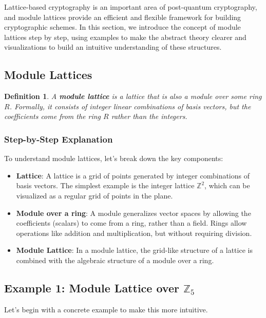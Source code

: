 \documentclass[12pt]{article}
\newtheorem{definition}{Definition}
\begin{document}
	Lattice-based cryptography is an important area of post-quantum cryptography, and module lattices provide an efficient and flexible framework for building cryptographic schemes. In this section, we introduce the concept of module lattices step by step, using examples to make the abstract theory clearer and visualizations to build an intuitive understanding of these structures.
	
	\subsection{Module Lattices}
	
	\begin{definition}
		A \textbf{module lattice} is a lattice that is also a module over some ring $R$. Formally, it consists of integer linear combinations of basis vectors, but the coefficients come from the ring $R$ rather than the integers.
	\end{definition}
	
	\subsubsection{Step-by-Step Explanation}
	To understand module lattices, let’s break down the key components:
	\begin{itemize}
		\item \textbf{Lattice}: A lattice is a grid of points generated by integer combinations of basis vectors. The simplest example is the integer lattice $\mathbb{Z}^2$, which can be visualized as a regular grid of points in the plane.
		\item \textbf{Module over a ring}: A module generalizes vector spaces by allowing the coefficients (scalars) to come from a ring, rather than a field. Rings allow operations like addition and multiplication, but without requiring division.
		\item \textbf{Module Lattice}: In a module lattice, the grid-like structure of a lattice is combined with the algebraic structure of a module over a ring.
	\end{itemize}
	
	\subsection{Example 1: Module Lattice over \(\mathbb{Z}_5\)}
	
	Let’s begin with a concrete example to make this more intuitive.
	
\end{document}
